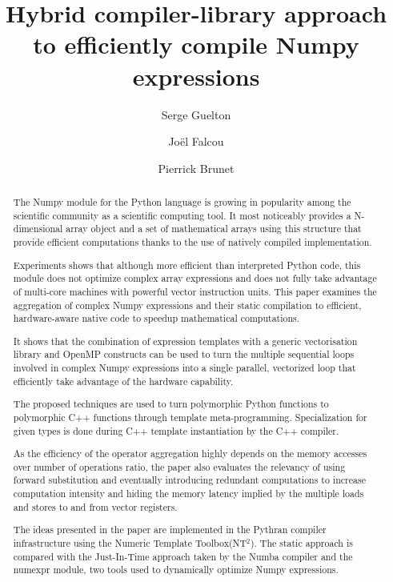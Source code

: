 \documentclass{llncs}
\begin{document}
\title{Hybrid compiler-library approach to efficiently compile Numpy expressions}

\author{Serge Guelton \and Joël Falcou \and Pierrick Brunet}

\maketitle

\begin{abstract}

    The Numpy module for the Python language is growing in popularity among the
    scientific community as a scientific computing tool. It most noticeably
    provides a N-dimensional array object and a set of mathematical arrays
    using this structure that provide efficient computations thanks to the use
    of natively compiled implementation.

    Experiments shows that although more efficient than interpreted Python code,
    this module does not optimize complex array expressions and does not fully
    take advantage of multi-core machines with powerful vector instruction
    units. This paper examines the aggregation of complex Numpy expressions and
    their static compilation to efficient, hardware-aware native code to
    speedup mathematical computations.

    It shows that the combination of expression templates with a generic
    vectorisation library and OpenMP constructs can be used to turn the
    multiple sequential loops involved in complex Numpy expressions into a
    single parallel, vectorized loop that efficiently take advantage of the
    hardware capability.
    
    The proposed techniques are used to turn polymorphic Python functions to
    polymorphic C++ functions through template meta-programming. Specialization
    for given types is done during C++ template instantiation by the C++
    compiler.
    
    As the efficiency of the operator aggregation highly depends on the memory
    accesses over number of operations ratio, the paper also evaluates the
    relevancy of using forward substitution and eventually introducing
    redundant computations to increase computation intensity and hiding the
    memory latency implied by the multiple loads and stores to and from vector
    registers.

    The ideas presented in the paper are implemented in the Pythran compiler
    infrastructure using the Numeric Template Toolbox(NT$^2$). The static
    approach is compared with the Just-In-Time approach taken by the Numba
    compiler and the numexpr module, two tools used to dynamically optimize
    Numpy expressions. 

\end{abstract}

%
%
\end{document}
